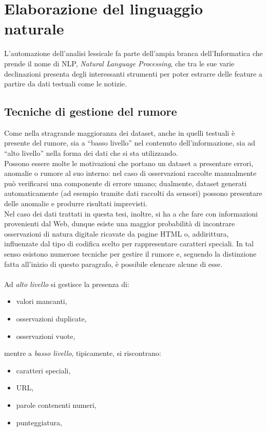 \documentclass[12pt]{report}
\theoremstyle{definition}
\begin{document}
\section{Elaborazione del linguaggio naturale} \label{nlp}
L'automazione dell'analisi lessicale fa parte dell'ampia branca dell'Informatica che prende il nome di NLP, \textit{Natural Language Processing}, che tra le sue varie declinazioni presenta degli interessanti strumenti per poter estrarre delle feature a partire da dati testuali come le notizie.


\subsection{Tecniche di gestione del rumore} \label{clean}
Come nella stragrande maggioranza dei dataset, anche in quelli testuali è presente del rumore, sia a ``basso livello'' nel contenuto dell'informazione, sia ad ``alto livello'' nella forma dei dati che si sta utilizzando.
\\
Possono essere molte le motivazioni che portano un dataset a presentare errori, anomalie o rumore al suo interno: 
nel caso di osservazioni raccolte manualmente può verificarsi una componente di errore umano; dualmente, dataset generati automaticamente (ad esempio tramite dati raccolti da sensori) possono presentare delle anomalie e produrre risultati imprevisti.
\\
Nel caso dei dati trattati in questa tesi, inoltre, si ha a che fare con informazioni provenienti dal Web, dunque esiste una maggior probabilità di incontrare osservazioni di natura digitale ricavate da pagine HTML o, addirittura, influenzate dal tipo di codifica scelto per rappresentare caratteri speciali.
In tal senso esistono numerose tecniche per gestire il rumore e, seguendo la distinzione fatta all'inizio di questo paragrafo, è possibile elencare alcune di esse.
\\
\\
Ad \textit{alto livello} si gestisce la presenza di:
\begin{itemize}
    \item valori mancanti,
    \item osservazioni duplicate,
    \item osservazioni vuote,
\end{itemize}

mentre a \textit{basso livello}, tipicamente, si riscontrano:
\begin{itemize}
    \item caratteri speciali,
    \item URL,
    \item parole contenenti numeri,
    \item punteggiatura,
\end{itemize}
\end{document}
